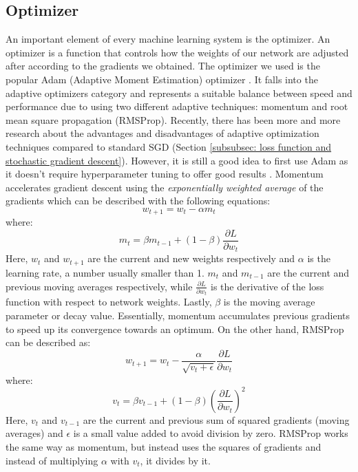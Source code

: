 \documentclass[times, utf8, diplomski, english]{fer_eng}
\begin{document}
\subsection{Optimizer}
\label{subsec:optimizer}

An important element of every machine learning system is the optimizer. An optimizer is a function that controls how the weights of our network are adjusted after according to the gradients we obtained. The optimizer we used is the popular Adam (Adaptive Moment Estimation) optimizer \cite{adam}. It falls into the adaptive optimizers category and represents a suitable balance between speed and performance due to using two different adaptive techniques: momentum and root mean square propagation (RMSProp). Recently, there has been more and more research about the advantages and disadvantages of adaptive optimization techniques compared to standard SGD (Section \ref{subsubsec: loss function and stochastic gradient descent}). However, it is still a good idea to first use Adam as it doesn't require hyperparameter tuning to offer good results \cite{optimizers}. Momentum accelerates gradient descent using the \textit{exponentially weighted average} of the gradients which can be described with the following equations:
\[ w_{t+1} = w_t - \alpha m_t \]
where:
\[ m_t = \beta m_{t-1} + (1 - \beta)  \frac{\partial L}{\partial w_t} \]
Here, $w_t$ and $w_{t+1}$ are the current and new weights respectively and $\alpha$ is the learning rate, a number usually smaller than 1. $m_t$ and $m_{t-1}$ are the current and previous moving averages respectively, while $\frac{\partial L}{\partial w_t}$ is the derivative of the loss function with respect to network weights. Lastly, $\beta$ is the moving average parameter or decay value. Essentially, momentum accumulates previous gradients to speed up its convergence towards an optimum. On the other hand, RMSProp can be described as:
\[ w_{t+1} = w_t - \frac{\alpha}{\sqrt{v_t + \epsilon}} \frac{\partial L}{\partial w_t} \]
where:
\[ v_t = \beta v_{t-1} + (1 - \beta) \left(\frac{\partial L}{\partial w_t}\right)^2 \]
Here, $v_t$ and $v_{t-1}$ are the current and previous sum of squared gradients (moving averages) and $\epsilon$ is a small value added to avoid division by zero. RMSProp works the same way as momentum, but instead uses the squares of gradients and instead of multiplying $\alpha$ with $v_t$, it divides by it.
\end{document}

